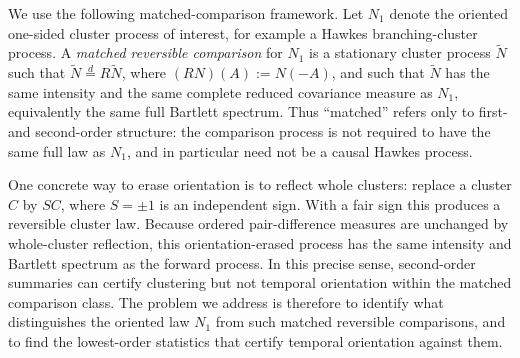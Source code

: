 \documentclass[aap,press]{apt} \volno{00} \partno{00}
\newcommand{\1}{\mathbf{1}}
\numberwithin{equation}{section}
\begin{document}
We use the following matched-comparison framework. Let \(N_1\)
denote the oriented one-sided cluster process of interest, for example
a Hawkes branching-cluster process. A \emph{matched reversible
comparison} for \(N_1\) is a stationary cluster process \(\widetilde N\)
such that \(\widetilde N\stackrel d=R\widetilde N\), where
\((RN)(A):=N(-A)\), and such that \(\widetilde N\) has the same
intensity and the same complete reduced covariance measure as \(N_1\),
equivalently the same full Bartlett spectrum. Thus ``matched'' refers
only to first- and second-order structure: the comparison process is
not required to have the same full law as \(N_1\), and in particular
need not be a causal Hawkes process.

One concrete way to erase orientation is to reflect whole clusters:
replace a cluster \(C\) by \(SC\), where \(S=\pm1\) is an independent
sign. With a fair sign this produces a reversible cluster law. Because
ordered pair-difference measures are unchanged by whole-cluster
reflection, this orientation-erased process has the same intensity and
Bartlett spectrum as the forward process. In this precise sense,
second-order summaries can certify clustering but not temporal
orientation within the matched comparison class. The problem we address is therefore to identify what distinguishes the
oriented law \(N_1\) from such matched reversible comparisons, and to
find the lowest-order statistics that certify temporal orientation
against them.
\end{document}
